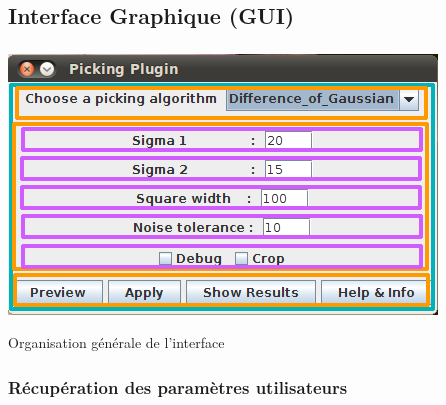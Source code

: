 \documentclass[11pt]{beamer}
\begin{document}
\subsection{Interface Graphique (GUI)}
\begin{frame}
\frametitle{\subsecname}\begin{center}

			\includegraphics[scale=0.5]{interface2.png}

			Organisation générale de l'interface
\end{center}
\end{frame}

\subsubsection*{Récupération des paramètres utilisateurs}
\end{document}

